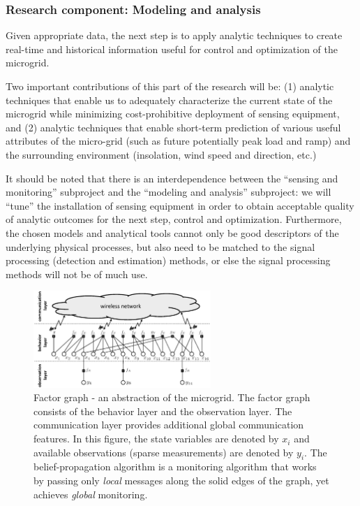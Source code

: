 
\subsubsection{Research component: Modeling and analysis}
\label{sec:modeling}

Given appropriate data, the next step is to apply analytic techniques to
create real-time and historical information useful for control and
optimization of the microgrid.

Two important contributions of this part of the research will be: (1) analytic techniques that enable us to adequately characterize the current state of the microgrid while minimizing cost-prohibitive deployment of sensing equipment, and (2) analytic techniques that enable short-term prediction of various useful attributes of the micro-grid (such as future potentially peak load and ramp) and the surrounding environment (insolation, wind speed and direction, etc.)  

It should be noted that there is an interdependence between the ``sensing
and monitoring'' subproject and the ``modeling and analysis'' subproject:
we will ``tune'' the installation of sensing equipment in order to obtain
acceptable quality of analytic outcomes for the next step, control and
optimization. Furthermore, the chosen models and analytical tools cannot
only be good descriptors of the underlying physical processes, but also
need to be matched to the signal processing (detection and estimation)
methods, or else the signal processing methods will not be of much use.


\begin{figure}[th!]
  \begin{center}
   \includegraphics[width=0.6\textwidth]{fig/Bipartite.eps}
   \caption{\label{B} Factor graph - an abstraction of the microgrid.
       The factor graph consists
       of the behavior layer and the observation layer. The
       communication layer provides additional global
       communication features. In this figure, the state
       variables are denoted by $x_i$ and available observations
       (sparse measurements) are denoted by $y_i$.
       The belief-propagation algorithm is
       a monitoring algorithm that works by passing only {\em local}
       messages along the solid edges of the graph, yet achieves {\em global}
       monitoring.}
  \end{center}
\end{figure}

